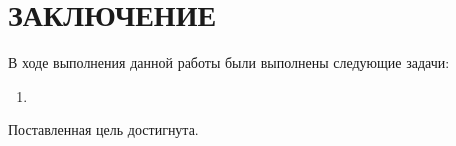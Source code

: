 \section*{\large ЗАКЛЮЧЕНИЕ}

В ходе выполнения данной работы были выполнены следующие задачи:
\begin{enumerate}
    \item 
\end{enumerate}


Поставленная цель достигнута. 